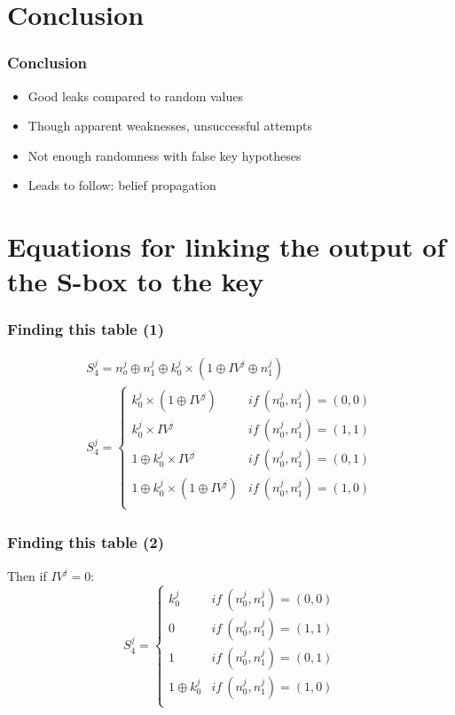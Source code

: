 \documentclass{beamer}
\begin{document}
	\section{Conclusion}
	\begin{frame}
		\frametitle{Conclusion}
		\begin{itemize}
			\item Good leaks compared to random values
			\item Though apparent weaknesses, unsuccessful attempts
			\item Not enough randomness with false key hypotheses
			\item Leads to follow: belief propagation
		\end{itemize}
	\end{frame}
	
	
	\appendix
	 
	
	
	\section{Equations for linking the output of the S-box to the key}
	\begin{frame}
		\frametitle{Finding this table (1)}
		\begin{gather*}
			S_4^j = n_o^j \oplus n_1^j \oplus k_0^j \times (1 \oplus IV^j \oplus n_1^j)\\
			S _4^j =\left \{	
			\begin{array}{ll}
				k_0^j \times (1 \oplus IV^j) & if\ (n_0^j,n_1^j)=(0,0)\\
				k_0^j \times IV^j & if\ (n_0^j,n_1^j)=(1,1)\\
				1 \oplus k_0^j \times IV^j & if\ (n_0^j,n_1^j)=(0,1)\\
				1 \oplus k_0^j \times (1 \oplus IV^j) & if\ (n_0^j,n_1^j)=(1,0)\\
			\end{array}
			\right.
		\end{gather*}
	\end{frame}
	
	\begin{frame}
		\frametitle{Finding this table (2)}
		\noindent Then if $IV^j = 0$: 
		$$S _4^j =\left \{	
		\begin{array}{ll}
			k_0^j& if\ (n_0^j,n_1^j)=(0,0)\\
			0& if\ (n_0^j,n_1^j)=(1,1)\\
			1& if\ (n_0^j,n_1^j)=(0,1)\\
			1 \oplus k_0^j& if\ (n_0^j,n_1^j)=(1,0)\\
		\end{array}
		\right.$$
	\end{frame}
	
\end{document}
